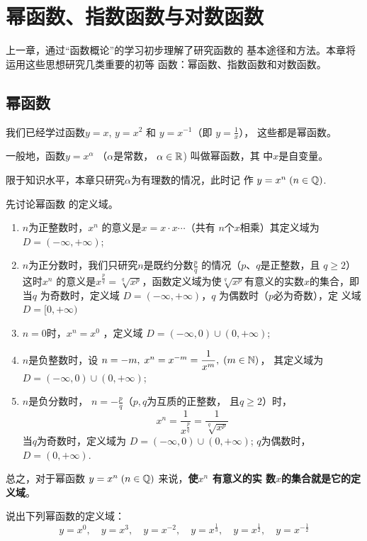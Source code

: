 \chapter{幂函数、指数函数与对数函数}
上一章，通过“函数概论”的学习初步理解了研究函数的
基本途径和方法。本章将运用这些思想研究几类重要的初等
函数：幂函数、指数函数和对数函数。

\section{幂函数}
我们已经学过函数$y=x$, 
$y=x^2$
和
$y=x^{-1}$（即
$y=\frac{1}{x}$），
这些都是幂函数。

一般地，函数$y=x^{\alpha}$
（$\alpha$是常数，
$\alpha\in\mathbb{R}$)
叫做幂函数，其
中$x$是自变量。

限于知识水平，本章只研究$\alpha$为有理数的情况，此时记
作
$y=x^n\; (n\in \mathbb{Q})$.

先讨论幂函数
的定义域。

\begin{enumerate}[(1)]
    \item $n$为正整数时，$x^n$
的意义是$x=x\cdot x\cdots$（共有
$n$个$x$相乘）其定义域为
$D=(-\infty,+\infty)$;
\item $n$为正分数时，我们只研究$n$是既约分数$\frac{p}{q}$
的情况（$p$、$q$是正整数，且
$q\ge 2$）这时$x^n$
的意义是$x^{\tfrac{p}{q}}=\sqrt[q]{x^p}$，函数定义域为使$\sqrt[q]{x^p}$有意义的实数$x$的集合，即当$q$
为奇数时，定义域
$D=(-\infty,+\infty)$，$q$
为偶数时（$p$必为奇数），定
义域
$D=[0,+\infty)$
\item $n=0$时，$x^n=x^0$
，定义域
$D=(-\infty,0)\cup (0,+\infty)$;
\item $n$是负整数时，设
$n=-m,\; x^n=x^{-m}=\dfrac{1}{x^m},\; (m\in\mathbb{N})$，
其定义域为$D=(-\infty,0)\cup (0,+\infty)$;
\item $n$是负分数时，
$n=-\frac{p}{q}$（$p,q$为互质的正整数，
且$q\ge 2$）时，
\[x^n=\frac{1}{x^{\tfrac{p}{q}}}=\frac{1}{\sqrt[q]{x^p}}\]
当$q$为奇数时，定义域为
$D=(-\infty,0)\cup (0,+\infty)$; $q$为偶数时，
$D=(0,+\infty)$.

\end{enumerate}

总之，对于幂函数
$y=x^n\; (n\in\mathbb{Q})$
来说，\textbf{使$x^n$
有意义的实
数$x$的集合就是它的定义域}。

\begin{example}
    说出下列幂函数的定义域：
\[y=x^0,\quad y=x^3,\quad y=x^{-2},\quad y=x^{\tfrac{1}{3}},\quad y=x^{\tfrac{1}{2}},\quad y=x^{-\tfrac{1}{2}}\]
\end{example}

